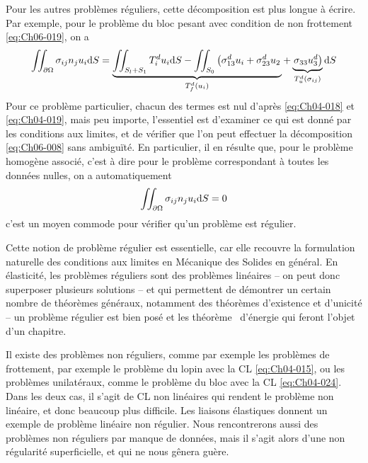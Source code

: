 Pour les autres problèmes réguliers, cette décomposition est plus longue à écrire.
Par exemple, pour le problème du bloc pesant avec condition de non frottement \eqref{eq:Ch06-019}, on a
\begin{equation}
    \iint_{\partial \Omega} \sigma_{ij} n_j u_i \mathrm{d} S = \underbrace{\iint_{S_l +S_1} T_i^d u_i \mathrm{d} S - \iint_{S_0} \left( \sigma_{13}^d u_i + \sigma_{23}^d u_2 \right.}_{T_f^d\left( u_i \right)} + \underbrace{ \left.\sigma_{33} u_3^d \right)}_{T_u^d\left(\sigma_{ij} \right)} \mathrm{d} S
    \label{eq:Ch06-010}
\end{equation}
Pour ce problème particulier, chacun des termes est nul d'après \eqref{eq:Ch04-018} et \eqref{eq:Ch04-019}, mais peu importe, l'essentiel est d'examiner ce qui est donné par les conditions aux limites, et de vérifier que l'on peut effectuer la décomposition \eqref{eq:Ch06-008} sans ambiguïté.
En particulier, il en résulte que, pour le problème homogène associé, c'est à dire pour le problème correspondant à toutes les données nulles, on a automatiquement
\begin{equation}
    \iint_{\partial \Omega} \sigma_{ij} n_j u_i \mathrm{d} S = 0
    \label{eq:Ch06-011}
\end{equation}
c'est un moyen commode pour vérifier qu'un problème est régulier.

Cette notion de problème régulier est essentielle, car elle recouvre la formulation naturelle des conditions aux limites en Mécanique des Solides en général.
En élasticité, les problèmes réguliers sont des problèmes linéaires -- on peut donc superposer plusieurs solutions -- et qui permettent de démontrer un certain nombre de théorèmes généraux, notamment des théorèmes d'existence et d'unicité -- un problème régulier est bien posé et les théorème~ d'énergie qui feront l'objet d'un chapitre.

Il existe des problèmes non réguliers, comme par exemple les problèmes de frottement, par exemple le problème du lopin avec la CL \eqref{eq:Ch04-015}, ou les problèmes unilatéraux, comme le problème du bloc avec la CL \eqref{eq:Ch04-024}.
Dans les deux cas, il s'agit de CL non linéaires qui rendent le problème non linéaire, et donc beaucoup plus difficile.
Les liaisons élastiques donnent un exemple de problème linéaire non régulier.
Nous rencontrerons aussi des problèmes non réguliers par manque de données, mais il s'agit alors d'une non régularité superficielle, et qui ne nous gênera guère.

